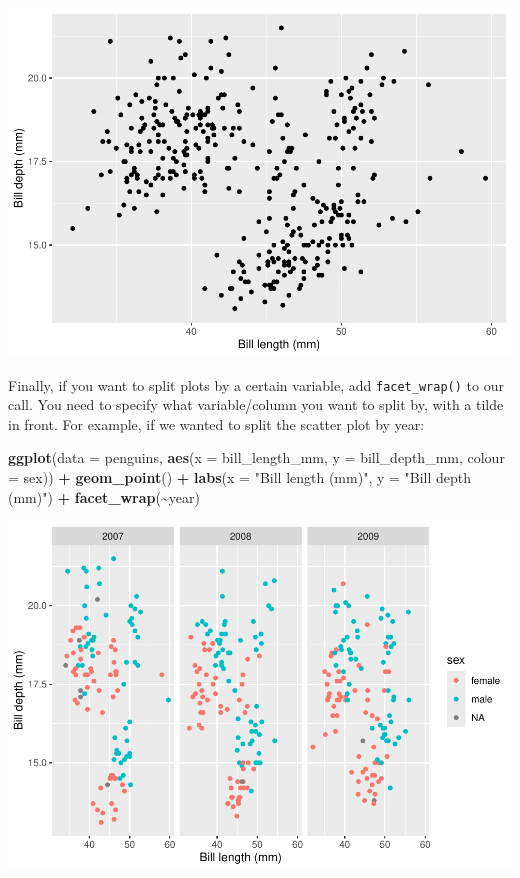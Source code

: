 \documentclass[
]{book}
\newenvironment{Shaded}{\begin{snugshade}}{\end{snugshade}}
\newcommand{\AttributeTok}[1]{\textcolor[rgb]{0.13,0.29,0.53}{#1}}
\newcommand{\FunctionTok}[1]{\textcolor[rgb]{0.13,0.29,0.53}{\textbf{#1}}}
\newcommand{\NormalTok}[1]{#1}
\newcommand{\SpecialCharTok}[1]{\textcolor[rgb]{0.81,0.36,0.00}{\textbf{#1}}}
\newcommand{\StringTok}[1]{\textcolor[rgb]{0.31,0.60,0.02}{#1}}
\begin{document}
\includegraphics{_main_files/figure-latex/unnamed-chunk-61-1.pdf}

Finally, if you want to split plots by a certain variable, add \texttt{facet\_wrap()} to our call. You need to specify what variable/column you want to split by, with a tilde in front. For example, if we wanted to split the scatter plot by year:

\begin{Shaded}
\begin{Highlighting}[]
\FunctionTok{ggplot}\NormalTok{(}\AttributeTok{data =}\NormalTok{ penguins, }\FunctionTok{aes}\NormalTok{(}\AttributeTok{x =}\NormalTok{ bill\_length\_mm, }\AttributeTok{y =}\NormalTok{ bill\_depth\_mm, }\AttributeTok{colour =}\NormalTok{ sex)) }\SpecialCharTok{+} \FunctionTok{geom\_point}\NormalTok{() }\SpecialCharTok{+}
  \FunctionTok{labs}\NormalTok{(}\AttributeTok{x =} \StringTok{"Bill length (mm)"}\NormalTok{, }\AttributeTok{y =} \StringTok{"Bill depth (mm)"}\NormalTok{)  }\SpecialCharTok{+} \FunctionTok{facet\_wrap}\NormalTok{(}\SpecialCharTok{\textasciitilde{}}\NormalTok{year)}
\end{Highlighting}
\end{Shaded}

\includegraphics{_main_files/figure-latex/unnamed-chunk-62-1.pdf}
\end{document}

